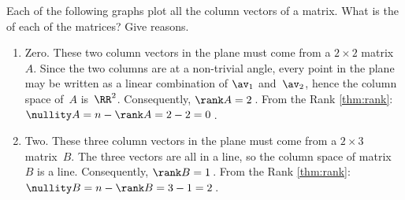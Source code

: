 \begin{example} 
Each of the following graphs plot all the column vectors of a matrix. What is the  of each of the matrices?  Give reasons.
\begin{enumerate}
\item {}
\begin{solution} 
Zero.
These two column vectors in the plane must come from a \(2\times2\) matrix~\(A\).
Since the two columns are at a non-trivial angle, every point in the plane may be written as a linear combination of \(\av_1\) and~\(\av_2\), hence the column space of~\(A\) is~\(\RR^2\).
Consequently, \(\rank A=2\)\,. 
From the Rank \cref{thm:rank}: \(\nullity A=n-\rank A=2-2=0\)\,. 
\end{solution}


\item {}
\begin{solution} 
Two.
These three column vectors in the plane must come from a \(2\times3\) matrix~\(B\).
The three vectors are all in a line, so the column space of matrix~\(B\) is a line.
Consequently, \(\rank B=1\)\,. 
From the Rank \cref{thm:rank}: \(\nullity B=n-\rank B=3-1=2\)\,. 
\end{solution}



\end{enumerate}
\end{example}
